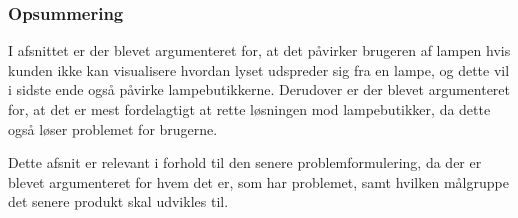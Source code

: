 





\subsubsection*{Opsummering}
I afsnittet er der blevet argumenteret for, at det påvirker brugeren af lampen hvis kunden ikke kan visualisere hvordan lyset udspreder sig fra en lampe, og dette vil i sidste ende også påvirke lampebutikkerne. Derudover er der blevet argumenteret for, at det er mest fordelagtigt at rette løsningen mod lampebutikker, da dette også løser problemet for brugerne.

Dette afsnit er relevant i forhold til den senere problemformulering, da der er blevet argumenteret for hvem det er, som har problemet, samt hvilken målgruppe det senere produkt skal udvikles til.

